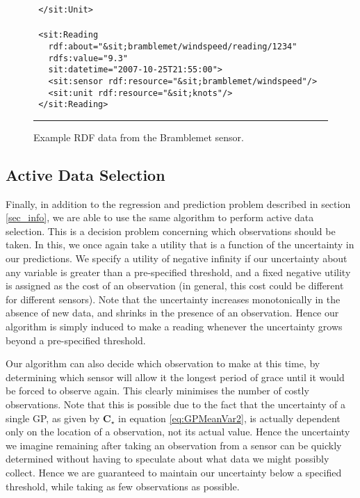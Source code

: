 \documentclass{acmtrans2m}
\newcommand{\mat}[1]{\mathbf{#1}}
\begin{document}
\begin{figure}
\begin{minipage}{2.6in}
\begin{tabbing}
\tt\scriptsize \ </\color{magenta}sit:Unit\color{black}>\\
\\
\tt\scriptsize \ <\color{magenta}sit:Reading\color{black}\\
\tt\scriptsize \ \ \ rdf:about=\color{blue}"\&sit;bramblemet/windspeed/reading/1234"\color{black}\\
\tt\scriptsize \ \ \ rdfs:value=\color{blue}"9.3"\color{black}\\
\tt\scriptsize \ \ \ sit:datetime=\color{blue}"2007-10-25T21:55:00"\color{black}>\\
\tt\scriptsize \ \ \ <\color{magenta}sit:sensor\color{black}~rdf:resource=\color{blue}"\&sit;bramblemet/windspeed"\color{black}/>\\
\tt\scriptsize \ \ \ <\color{magenta}sit:unit\color{black}~rdf:resource=\color{blue}"\&sit;knots"\color{black}/>\\
\tt\scriptsize \ </\color{magenta}sit:Reading\color{black}>\\
\normalsize
\end{tabbing}
\end{minipage}\par
\rule{3.3in}{.005in} 
\caption{Example RDF data from the Bramblemet sensor.}
\label{rdf}
\end{figure}

\subsection{Active Data Selection}

\noindent Finally, in addition to the regression and prediction problem described in section \ref{sec_info}, we are able to use the same algorithm to perform active data selection. This is a decision problem concerning which observations should be taken. In this, we once again take a utility that is a function of the uncertainty in our predictions. We specify a utility of negative infinity if our uncertainty about any variable is greater than a pre-specified threshold, and a fixed negative utility is assigned as the cost of an observation (in general, this cost could be different for different sensors). Note that the uncertainty increases monotonically in the absence of new data, and shrinks in the presence of an observation. Hence our algorithm is simply induced to make a reading whenever the uncertainty grows beyond a pre-specified threshold. 

Our algorithm can also decide which observation to make at this time, by determining which sensor will allow it the longest period of grace until it would be forced to observe again. This clearly minimises the number of costly observations. Note that this is possible due to the fact that the uncertainty of a single GP, as given by $\mat{C}_\star$ in equation \eqref{eq:GPMeanVar2}, is actually dependent only on the location of a observation, not its actual value. Hence the uncertainty we imagine remaining after taking an observation from a sensor can be quickly determined without having to speculate about what data we might possibly collect. Hence we are guaranteed to maintain our uncertainty below a specified threshold, while taking as few observations as possible.
\end{document}
